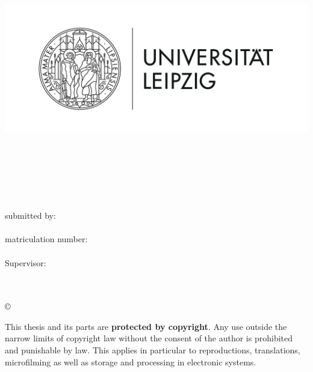 \thispagestyle{plain}
\begin{titlepage}

\begin{center}
\includegraphics[height=7cm]{Bilder/Uni-L.png}\\[2.5ex]

\institut\\
\fakultaet\\
\fachgebiet\\[6ex]

\textbf{\large\titel}\\[1.5ex]
\art\\[6ex]

\normalsize
submitted by:\\
\autor\\[1.5ex]
matriculation number:\\
\matrikelnr\\[1.5ex]
Supervisor:\\
\erstbetreuer\\
\zweitbetreuer\\[1.0ex]
\end{center}


\begin{center}
\copyright\ \jahr\\[1.0ex]
\end{center}

\singlespacing
\small
\noindent This thesis and its parts are \textbf{protected by copyright}. Any use outside the narrow limits of copyright law without the consent of the author is prohibited and punishable by law. This applies in particular to reproductions, translations, microfilming as well as storage and processing in electronic systems.

\end{titlepage}
